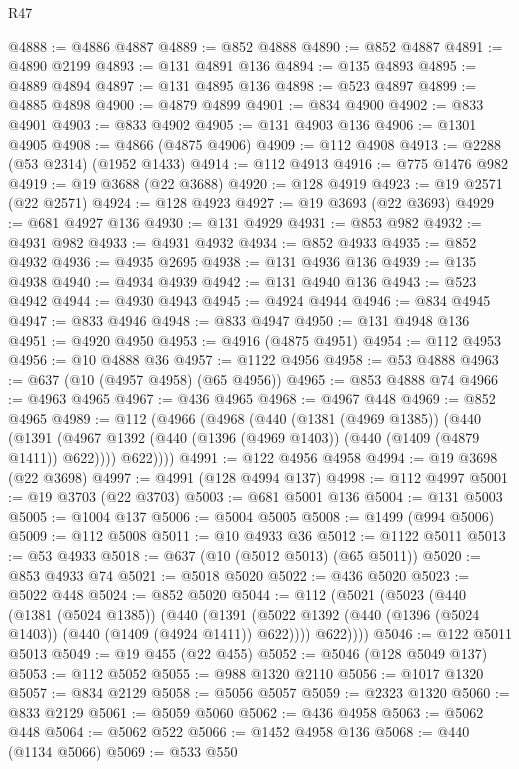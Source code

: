 \begin{lexlean}{R47}
\begin{coremodule}
@4888 := @4886 @4887
@4889 := @852 @4888
@4890 := @852 @4887
@4891 := @4890 @2199
@4893 := @131 @4891 @136
@4894 := @135 @4893
@4895 := @4889 @4894
@4897 := @131 @4895 @136
@4898 := @523 @4897
@4899 := @4885 @4898
@4900 := @4879 @4899
@4901 := @834 @4900
@4902 := @833 @4901
@4903 := @833 @4902
@4905 := @131 @4903 @136
@4906 := @1301 @4905
@4908 := @4866 (@4875 @4906)
@4909 := @112 @4908
@4913 := @2288 (@53 @2314) (@1952 @1433)
@4914 := @112 @4913
@4916 := @775 @1476 @982
@4919 := @19 @3688 (@22 @3688)
@4920 := @128 @4919
@4923 := @19 @2571 (@22 @2571)
@4924 := @128 @4923
@4927 := @19 @3693 (@22 @3693)
@4929 := @681 @4927 @136
@4930 := @131 @4929
@4931 := @853 @982
@4932 := @4931 @982
@4933 := @4931 @4932
@4934 := @852 @4933
@4935 := @852 @4932
@4936 := @4935 @2695
@4938 := @131 @4936 @136
@4939 := @135 @4938
@4940 := @4934 @4939
@4942 := @131 @4940 @136
@4943 := @523 @4942
@4944 := @4930 @4943
@4945 := @4924 @4944
@4946 := @834 @4945
@4947 := @833 @4946
@4948 := @833 @4947
@4950 := @131 @4948 @136
@4951 := @4920 @4950
@4953 := @4916 (@4875 @4951)
@4954 := @112 @4953
@4956 := @10 @4888 @36
@4957 := @1122 @4956
@4958 := @53 @4888
@4963 := @637 (@10 (@4957 @4958) (@65 @4956))
@4965 := @853 @4888 @74
@4966 := @4963 @4965
@4967 := @436 @4965
@4968 := @4967 @448
@4969 := @852 @4965
@4989 := @112
    (@4966
      (@4968
        (@440
          (@1381 (@4969 @1385))
          (@440
            (@1391 (@4967 @1392 (@440 (@1396 (@4969 @1403)) (@440 (@1409 (@4879 @1411)) @622))))
            @622))))
@4991 := @122 @4956 @4958
@4994 := @19 @3698 (@22 @3698)
@4997 := @4991 (@128 @4994 @137)
@4998 := @112 @4997
@5001 := @19 @3703 (@22 @3703)
@5003 := @681 @5001 @136
@5004 := @131 @5003
@5005 := @1004 @137
@5006 := @5004 @5005
@5008 := @1499 (@994 @5006)
@5009 := @112 @5008
@5011 := @10 @4933 @36
@5012 := @1122 @5011
@5013 := @53 @4933
@5018 := @637 (@10 (@5012 @5013) (@65 @5011))
@5020 := @853 @4933 @74
@5021 := @5018 @5020
@5022 := @436 @5020
@5023 := @5022 @448
@5024 := @852 @5020
@5044 := @112
    (@5021
      (@5023
        (@440
          (@1381 (@5024 @1385))
          (@440
            (@1391 (@5022 @1392 (@440 (@1396 (@5024 @1403)) (@440 (@1409 (@4924 @1411)) @622))))
            @622))))
@5046 := @122 @5011 @5013
@5049 := @19 @455 (@22 @455)
@5052 := @5046 (@128 @5049 @137)
@5053 := @112 @5052
@5055 := @988 @1320 @2110
@5056 := @1017 @1320
@5057 := @834 @2129
@5058 := @5056 @5057
@5059 := @2323 @1320
@5060 := @833 @2129
@5061 := @5059 @5060
@5062 := @436 @4958
@5063 := @5062 @448
@5064 := @5062 @522
@5066 := @1452 @4958 @136
@5068 := @440 (@1134 @5066)
@5069 := @533 @550

\end{coremodule}
\end{lexlean}

